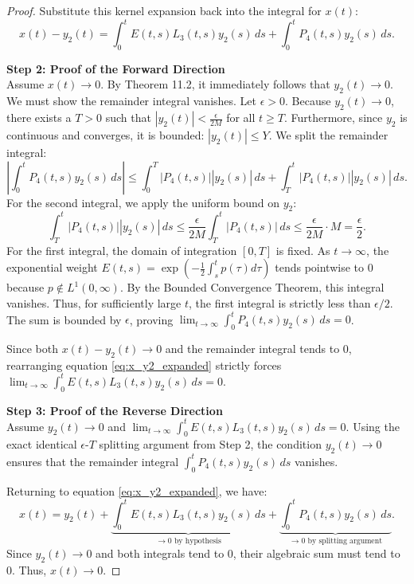 \documentclass[10pt,reqno]{amsart}
\theoremstyle{definition}
\begin{document}
\begin{proof}
		Substitute this kernel expansion back into the integral for $x(t)$:
		\begin{equation} \label{eq:x_y2_expanded}
			x(t) - y_2(t) = \int_0^t E(t, s) L_3(t, s) y_2(s) \, ds + \int_0^t P_4(t, s) y_2(s) \, ds.
		\end{equation}
		
		\textbf{Step 2: Proof of the Forward Direction}\\
		Assume $x(t) \to 0$. By Theorem 11.2, it immediately follows that $y_2(t) \to 0$. We must show the remainder integral vanishes. Let $\epsilon > 0$. Because $y_2(t) \to 0$, there exists a $T > 0$ such that $|y_2(t)| < \frac{\epsilon}{2M}$ for all $t \ge T$. Furthermore, since $y_2$ is continuous and converges, it is bounded: $|y_2(t)| \le Y$. We split the remainder integral:
		\[ \left| \int_0^t P_4(t, s) y_2(s) \, ds \right| \le \int_0^T |P_4(t, s)| |y_2(s)| \, ds + \int_T^t |P_4(t, s)| |y_2(s)| \, ds. \]
		For the second integral, we apply the uniform bound on $y_2$:
		\[ \int_T^t |P_4(t, s)| |y_2(s)| \, ds \le \frac{\epsilon}{2M} \int_T^t |P_4(t, s)| \, ds \le \frac{\epsilon}{2M} \cdot M = \frac{\epsilon}{2}. \]
		For the first integral, the domain of integration $[0, T]$ is fixed. As $t \to \infty$, the exponential weight $E(t, s) = \exp(-\frac{1}{2}\int_s^t p(\tau)d\tau)$ tends pointwise to $0$ because $p \notin L^1(0, \infty)$. By the Bounded Convergence Theorem, this integral vanishes. Thus, for sufficiently large $t$, the first integral is strictly less than $\epsilon/2$. The sum is bounded by $\epsilon$, proving $\lim_{t \to \infty} \int_0^t P_4(t, s) y_2(s) \, ds = 0$.
		
		Since both $x(t) - y_2(t) \to 0$ and the remainder integral tends to $0$, rearranging equation \eqref{eq:x_y2_expanded} strictly forces $\lim_{t \to \infty} \int_0^t E(t, s) L_3(t, s) y_2(s) \, ds = 0$.
		
		\textbf{Step 3: Proof of the Reverse Direction}\\
		Assume $y_2(t) \to 0$ and $\lim_{t \to \infty} \int_0^t E(t, s) L_3(t, s) y_2(s) \, ds = 0$. Using the exact identical $\epsilon$-$T$ splitting argument from Step 2, the condition $y_2(t) \to 0$ ensures that the remainder integral $\int_0^t P_4(t, s) y_2(s) \, ds$ vanishes. 
		
		Returning to equation \eqref{eq:x_y2_expanded}, we have:
		\[ x(t) = y_2(t) + \underbrace{\int_0^t E(t, s) L_3(t, s) y_2(s) \, ds}_{\to 0 \text{ by hypothesis}} + \underbrace{\int_0^t P_4(t, s) y_2(s) \, ds}_{\to 0 \text{ by splitting argument}}. \]
		Since $y_2(t) \to 0$ and both integrals tend to $0$, their algebraic sum must tend to $0$. Thus, $x(t) \to 0$.
	\end{proof}
	
\end{document}
